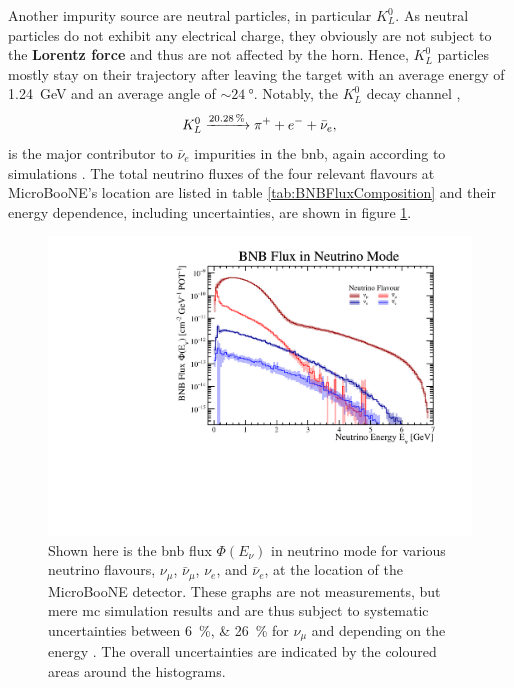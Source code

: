 Another impurity source are neutral particles, in particular $K^0_L$. As neutral particles do not exhibit any electrical charge, they obviously are not subject to the \textbf{Lorentz force} and thus are not affected by the horn. Hence, $K^0_L$ particles mostly stay on their trajectory after leaving the target with an average energy of \SI{1.24}{\giga\electronvolt} and an average angle of $\sim\SI{24}{\degree}$. Notably, the $K^0_L$ decay channel \cite{PDG2018},
\begin{equation}
    \ce{$K^{0}_{L}$ ->[\SI{20.28}{\percent}] $\pi^{+}$ + $e^-$ + $\bar{\nu}_{e}$},
\end{equation}
is the major contributor to $\bar{\nu}_{e}$ impurities in the \gls{bnb}, again according to simulations \cite{BNBBeamFlux}. The total neutrino fluxes of the four relevant flavours at MicroBooNE's location are listed in table \ref{tab:BNBFluxComposition} and their energy dependence, including uncertainties, are shown in figure \ref{fig:BNBFlux}.
\begin{figure}[htbp]
    \centering
    \includegraphics[width=1.0\textwidth]{images/MicroBooNE/BNBFluxMicroBooNE.pdf}
    \caption[BNB Flux in Neutrino Mode at MicroBooNE]{Shown here is the \gls{bnb} flux $\Phi(E_\nu)$ in neutrino mode for various neutrino flavours, $\nu_\mu$, $\bar{\nu}_\mu$, $\nu_e$, and $\bar{\nu}_e$, at the location of the MicroBooNE detector. These graphs are not measurements, but mere \gls{mc} simulation results and are thus subject to systematic uncertainties between \SIlist{6;26}{\percent} for $\nu_\mu$ and depending on the energy \cite{BNBBeamFlux,BNBBeamUncertainty}. The overall uncertainties are indicated by the coloured areas around the histograms.}
    \label{fig:BNBFlux}
\end{figure}

